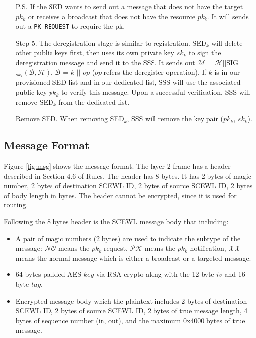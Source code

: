 \documentclass[11pt,oneside,onecolumn,letterpaper]{article}
\begin{document}
\begin{itemize}
  P.S. If the SED wants to send out a message that does not have the target $pk_k$ or receives a broadcast that does not have the resource $pk_k$. 
  It will sends out a \verb|PK_REQUEST| to require the pk.

  \item[Step 5.] The deregistration stage is similar to registration.
  SED$_k$ will delete other public keys first, then uses its own private key $sk_k$ to sign the deregistration message and send it to the SSS.
  It sends out $\mathcal{M}$ = $\mathcal{H} || $SIG$_{sk_k}(\mathcal{B}, \mathcal{H})$, $\mathcal{B}$ = $k$ $||$ $op$ ($op$ refers the deregister operation).
  If $k$ is in our provisioned SED list and in our dedicated list, SSS will use the associated public key $pk_k$ to verify this message.
  Upon a successful verification, SSS will remove SED$_k$ from the dedicated list.

  \item[Remove SED.] When removing SED$_k$, SSS will remove the key pair ($pk_k$, $sk_k$).
\end{itemize}

\subsection{Message Format}

Figure \ref{fig:msg} shows the message format.
The layer 2 frame has a header described in Section 4.6 of Rules.
The header has 8 bytes.
It has 2 bytes of magic number, 2 bytes of destination SCEWL ID, 2 bytes of source SCEWL ID, 2 bytes of body length in bytes.
The header cannot be encrypted, since it is used for routing.

Following the 8 bytes header is the SCEWL message body that including:
\begin{itemize}
  \item A pair of magic numbers (2 bytes) are used to indicate the subtype of the message: $\mathcal{NO}$ means the $pk_k$ request, $\mathcal{PK}$ means the $pk_k$ notification, $\mathcal{XX}$ means the normal message which is either a broadcast or a targeted message.
  \item 64-bytes padded AES $key$ via RSA crypto along with the 12-byte $iv$ and 16-byte $tag$.
  \item Encrypted message body which the plaintext includes 2 bytes of destination SCEWL ID, 2 bytes of source SCEWL ID, 2 bytes of true message length, 4 bytes of sequence number (in, out), and the maximum 0x4000 bytes of true message.
\end{itemize}
\end{document}
